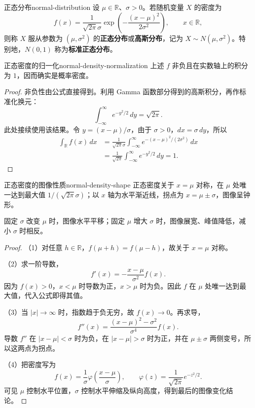 \begin{mydefinition}{正态分布}{normal-distribution}
设 $\mu\in\mathbb R$、$\sigma>0$。若随机变量 $X$ 的密度为
\[
f(x)=\frac1{\sqrt{2\pi}\sigma}
\exp\left(-\frac{(x-\mu)^2}{2\sigma^2}\right),
\qquad x\in\mathbb R,
\]
则称 $X$ 服从参数为 $(\mu,\sigma^2)$ 的\textbf{正态分布}或\textbf{高斯分布}，记为 $X\sim N(\mu,\sigma^2)$。特别地，$N(0,1)$ 称为\textbf{标准正态分布}。
\end{mydefinition}

\begin{proposition}{正态密度的归一化}{normal-density-normalization}
上述 $f$ 非负且在实数轴上的积分为 $1$，因而确实是概率密度。
\end{proposition}

\begin{proof}
非负性由公式直接得到。利用 Gamma 函数部分得到的高斯积分，再作标准化换元：
\[
\int_{-\infty}^{\infty}e^{-y^2/2}\,dy=\sqrt{2\pi}.
\]
此处接续使用该结果。令 $y=(x-\mu)/\sigma$，由于 $\sigma>0$，$dx=\sigma\,dy$，所以
\[
\begin{aligned}
\int_{\mathbb R}f(x)\,dx
&=\frac1{\sqrt{2\pi}\sigma}
\int_{-\infty}^{\infty}e^{-(x-\mu)^2/(2\sigma^2)}\,dx\\
&=\frac1{\sqrt{2\pi}}
\int_{-\infty}^{\infty}e^{-y^2/2}\,dy=1.
\end{aligned}
\]
\end{proof}

\begin{proposition}{正态密度的图像性质}{normal-density-shape}
正态密度关于 $x=\mu$ 对称，在 $\mu$ 处唯一达到最大值 $1/(\sqrt{2\pi}\sigma)$；以 $x$ 轴为水平渐近线，拐点为 $x=\mu\pm\sigma$，图像呈钟形。

固定 $\sigma$ 改变 $\mu$ 时，图像水平平移；固定 $\mu$ 增大 $\sigma$ 时，图像展宽、峰值降低，减小 $\sigma$ 时相反。
\end{proposition}

\begin{proof}

（1）对任意 $h\in\mathbb R$，$f(\mu+h)=f(\mu-h)$，故关于 $x=\mu$ 对称。

（2）求一阶导数，
\[
f'(x)=-\frac{x-\mu}{\sigma^2}f(x).
\]
因为 $f(x)>0$，$x<\mu$ 时导数为正，$x>\mu$ 时为负。因此 $f$ 在 $\mu$ 处唯一达到最大值，代入公式即得其值。

（3）当 $|x|\to\infty$ 时，指数趋于负无穷，故 $f(x)\to0$。再求导，
\[
f''(x)=\frac{(x-\mu)^2-\sigma^2}{\sigma^4}f(x).
\]
导数 $f''$ 在 $|x-\mu|<\sigma$ 时为负，在 $|x-\mu|>\sigma$ 时为正，并在 $\mu\pm\sigma$ 两侧变号，所以这两点为拐点。

（4）把密度写为
\[
f(x)=\frac1{\sigma}\varphi\left(\frac{x-\mu}{\sigma}\right),
\qquad
\varphi(z)=\frac1{\sqrt{2\pi}}e^{-z^2/2}.
\]
可见 $\mu$ 控制水平位置，$\sigma$ 控制水平伸缩及纵向高度，得到最后的图像变化结论。
\end{proof}

